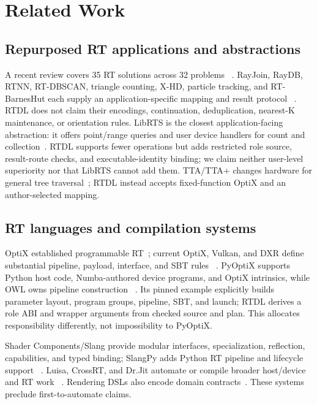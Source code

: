 \documentclass[sigplan,screen,review,anonymous]{acmart}
\newcommand{\rtdl}{\textsc{RTDL}\xspace}
\begin{document}
\section{Related Work}

\subsection{Repurposed RT applications and abstractions}

A recent review covers 35 RT solutions across 32 problems
~\cite{meneses2026rtcoresurvey}. RayJoin, RayDB, RTNN, RT-DBSCAN, triangle
counting, X-HD, particle tracking, and RT-BarnesHut each supply an
application-specific mapping and result protocol
~\cite{geng2024rayjoin,shi2025raydb,zhu2022rtnn,nagarajan2023rtdbscan,xiao2025rtgraph,geng2026xhd,wang2022particle,nagarajan2025rtbarneshut}.
\rtdl does not claim their encodings, continuation, deduplication, nearest-K
maintenance, or orientation rules. LibRTS is the closest application-facing
abstraction: it offers point/range queries and user device handlers for count
and collection~\cite{geng2025librts}. \rtdl supports fewer operations but adds
restricted role source, result-route checks, and executable-identity binding;
we claim neither user-level superiority nor that LibRTS cannot add them.
TTA/TTA+ changes hardware for general tree traversal~\cite{ha2024tta}; \rtdl
instead accepts fixed-function OptiX and an author-selected mapping.

\subsection{RT languages and compilation systems}

OptiX established programmable RT~\cite{parker2010optix}; current OptiX,
Vulkan, and DXR define substantial pipeline, payload, interface, and SBT rules
~\cite{nvidiaOptix9Guide,khronosVulkanInterfaces,khronosVulkanRT,microsoftDXRPAQ}.
PyOptiX supports Python host code, Numba-authored device programs, and OptiX
intrinsics, while OWL owns pipeline construction
~\cite{nvidiaPyOptix,wang2022numbapyoptix,nvidiaOWL}. Its pinned example
explicitly builds parameter layout, program groups, pipeline, SBT, and launch;
\rtdl derives a role ABI and wrapper arguments from checked source and plan.
This allocates responsibility differently, not impossibility to PyOptiX.

Shader Components/Slang provide modular interfaces, specialization,
reflection, capabilities, and typed binding; SlangPy adds Python RT pipeline and
lifecycle support
~\cite{he2017shaderComponents,he2018slang,slangCapabilities,slangShaderCursors,slangPyRelease,slangPyDocs}.
Luisa, CrossRT, and Dr.Jit automate or compile broader host/device and RT work
~\cite{zheng2022luisa,luisaCompute,frolov2024crossrt,jakob2022drjit}. Rendering
DSLs also encode domain contracts~\cite{openShadingLanguageDocs}. These systems
preclude first-to-automate claims.
\end{document}
